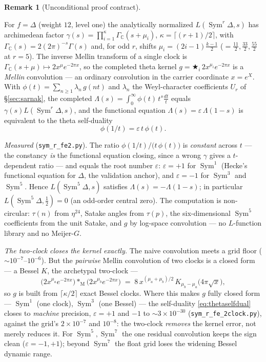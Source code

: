 \documentclass[11pt]{article}
\theoremstyle{definition}
\newtheorem{remark}[theorem]{Remark}
\newcommand{\Sym}{\operatorname{Sym}}
\begin{document}
\begin{remark}[Unconditional proof contract]
\begin{enumerate}
For $f=\Delta$ (weight $12$, level one) the analytically normalized $L(\Sym^r\Delta,s)$ has archimedean
factor $\gamma(s)=\prod_{i=1}^{\kappa}\Gamma_{\mathbb C}(s+\mu_i)$, $\kappa=\lceil (r{+}1)/2\rceil$, with
$\Gamma_{\mathbb C}(s)=2(2\pi)^{-s}\Gamma(s)$ and, for odd $r$, shifts $\mu_i=(2i{-}1)\tfrac{k-1}{2}$
($=\tfrac{11}2,\tfrac{33}2,\tfrac{55}2$ at $r=5$). The inverse Mellin transform of a single clock is
$\Gamma_{\mathbb C}(s+\mu)\!\mapsto\! 2x^{\mu}e^{-2\pi x}$, so the completed theta kernel
$g=\bigstar_{i}\,2x^{\mu_i}e^{-2\pi x}$ is a \emph{Mellin} convolution --- an ordinary convolution in the
carrier coordinate $x=e^{X}$. With $\phi(t)=\sum_{n\ge1}\lambda_n\,g(nt)$ and $\lambda_n$ the
Weyl-character coefficients $U_r$ of \S\ref{sec:sarnak}, the completed $\Lambda(s)=\int_0^\infty\phi(t)\,
t^{s}\tfrac{dt}{t}$ equals $\gamma(s)L(\Sym^r\Delta,s)$, and the functional equation
$\Lambda(s)=\varepsilon\,\Lambda(1-s)$ is equivalent to the theta self-duality
\begin{equation}\label{eq:thetaselfdual}
  \phi(1/t)=\varepsilon\,t\,\phi(t).
\end{equation}

\emph{Measured} (\texttt{sym\_r\_fe2.py}). The ratio $\phi(1/t)/\bigl(t\,\phi(t)\bigr)$ is \emph{constant}
across $t$ --- the constancy \emph{is} the functional equation closing, since a wrong $\gamma$ gives a
$t$-dependent ratio --- and equals the root number $\varepsilon$: $\varepsilon=+1$ for $\Sym^1$ (Hecke's
functional equation for $\Delta$, the validation anchor), and $\varepsilon=-1$ for $\Sym^3$ and $\Sym^5$.
Hence $L(\Sym^5\Delta,s)$ satisfies $\Lambda(s)=-\Lambda(1-s)$; in particular $L(\Sym^5\Delta,\tfrac12)=0$
(an odd-order central zero). The computation is non-circular: $\tau(n)$ from $\eta^{24}$, Satake angles
from $\tau(p)$, the six-dimensional $\Sym^5$ coefficients from the unit Satake, and $g$ by log-space
convolution --- no $L$-function library and no Meijer-$G$.

\emph{The two-clock closes the kernel exactly.} The naive convolution meets a grid floor
($\sim10^{-7}$--$10^{-6}$). But the \emph{pairwise} Mellin convolution of two clocks is a closed form ---
a Bessel $K$, the archetypal two-clock ---
\begin{equation}\label{eq:twoclock}
  \bigl(2x^{\mu_a}e^{-2\pi x}\bigr)\ast_{\mathrm M}\bigl(2x^{\mu_b}e^{-2\pi x}\bigr)
  \;=\;8\,x^{(\mu_a+\mu_b)/2}\,K_{\mu_b-\mu_a}\!\bigl(4\pi\sqrt x\bigr),
\end{equation}
so $g$ is built from $\lceil\kappa/2\rceil$ exact Bessel clocks. Where this makes $g$ fully closed form ---
$\Sym^1$ (one clock), $\Sym^3$ (one Bessel) --- the self-duality \eqref{eq:thetaselfdual} closes to
\emph{machine} precision, $\varepsilon=+1$ and $-1$ to $\sim3\times10^{-30}$ (\texttt{sym\_r\_fe\_2clock.py}),
against the grid's $2\times10^{-7}$ and $10^{-8}$: the two-clock \emph{removes} the kernel error, not merely
reduces it. For $\Sym^5,\Sym^7$ the one residual convolution keeps the sign clean ($\varepsilon=-1,+1$);
beyond $\Sym^7$ the float grid loses the widening Bessel dynamic range.


\end{enumerate}
\end{remark}
\end{document}
